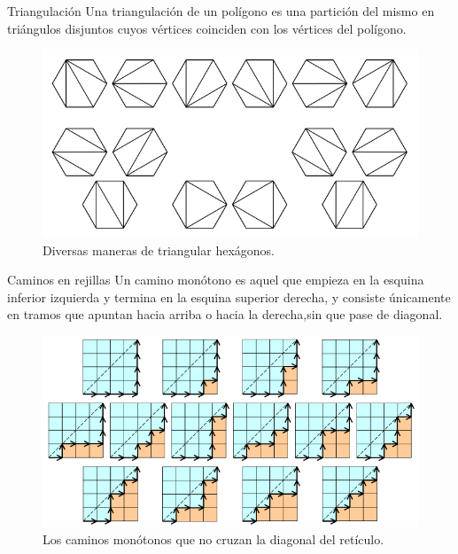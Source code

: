 \begin{frame}
\frametitle{\subsubsecname}

\begin{minipage}{0.45\paperwidth}
	\begin{block}{Triangulación}
	Una triangulación de un polígono es una partición del mismo en triángulos disjuntos cuyos vértices coinciden con los vértices del polígono.
	\end{block}
	\begin{figure}
		\centering
		\includegraphics[width=0.4\paperwidth]{ca1}
		\caption{Diversas maneras de triangular hexágonos.}
	\end{figure}
\end{minipage}
\hfill
\begin{minipage}{0.45\paperwidth}
	\begin{block}{Caminos en rejillas}
	Un camino monótono es aquel que empieza en la esquina inferior izquierda y termina en la esquina superior derecha, y consiste únicamente en tramos que apuntan hacia arriba o hacia la derecha,sin que pase de diagonal.
	\end{block}
	\begin{figure}
		\centering
		\includegraphics[width=0.4\paperwidth]{ca(1)}
		\caption{Los caminos monótonos que no cruzan la diagonal del retículo.}
	\end{figure}
\end{minipage}
\end{frame}